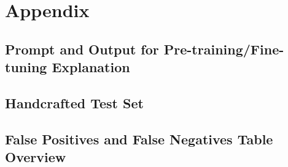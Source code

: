 \chapter*{Appendix}

\section{Prompt and Output for Pre-training/Fine-tuning Explanation}
\label{appendix:prompt_pdf}


\section{Handcrafted Test Set}
\label{appendix:handcrafted_testset}




\section{False Positives and False Negatives Table Overview}
\label{appendix:fp_fn_table}

